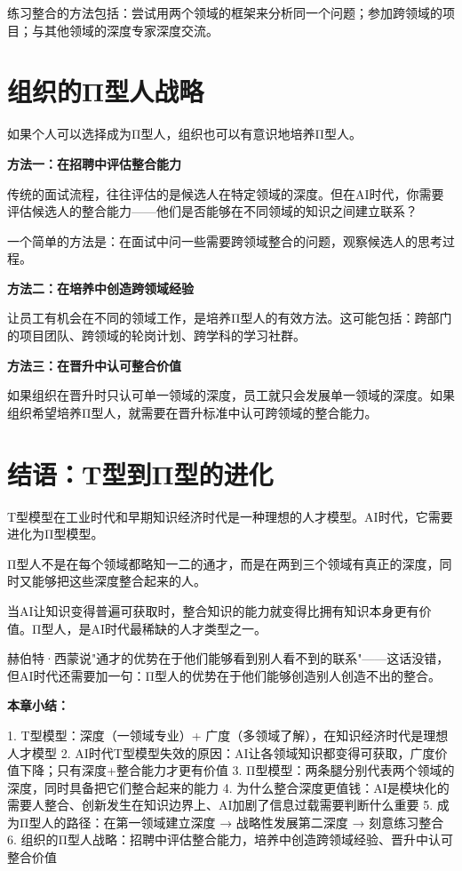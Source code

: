 练习整合的方法包括：尝试用两个领域的框架来分析同一个问题；参加跨领域的项目；与其他领域的深度专家深度交流。

\section{组织的Π型人战略}


如果个人可以选择成为Π型人，组织也可以有意识地培养Π型人。

\textbf{方法一：在招聘中评估整合能力}

传统的面试流程，往往评估的是候选人在特定领域的深度。但在AI时代，你需要评估候选人的整合能力——他们是否能够在不同领域的知识之间建立联系？

一个简单的方法是：在面试中问一些需要跨领域整合的问题，观察候选人的思考过程。

\textbf{方法二：在培养中创造跨领域经验}

让员工有机会在不同的领域工作，是培养Π型人的有效方法。这可能包括：跨部门的项目团队、跨领域的轮岗计划、跨学科的学习社群。

\textbf{方法三：在晋升中认可整合价值}

如果组织在晋升时只认可单一领域的深度，员工就只会发展单一领域的深度。如果组织希望培养Π型人，就需要在晋升标准中认可跨领域的整合能力。

\section{结语：T型到Π型的进化}


T型模型在工业时代和早期知识经济时代是一种理想的人才模型。AI时代，它需要进化为Π型模型。

Π型人不是在每个领域都略知一二的通才，而是在两到三个领域有真正的深度，同时又能够把这些深度整合起来的人。

当AI让知识变得普遍可获取时，整合知识的能力就变得比拥有知识本身更有价值。Π型人，是AI时代最稀缺的人才类型之一。

赫伯特·西蒙说"通才的优势在于他们能够看到别人看不到的联系"——这话没错，但AI时代还需要加一句：Π型人的优势在于他们能够创造别人创造不出的整合。


\textbf{本章小结：}

1. T型模型：深度（一领域专业）+ 广度（多领域了解），在知识经济时代是理想人才模型
2. AI时代T型模型失效的原因：AI让各领域知识都变得可获取，广度价值下降；只有深度+整合能力才更有价值
3. Π型模型：两条腿分别代表两个领域的深度，同时具备把它们整合起来的能力
4. 为什么整合深度更值钱：AI是模块化的需要人整合、创新发生在知识边界上、AI加剧了信息过载需要判断什么重要
5. 成为Π型人的路径：在第一领域建立深度 → 战略性发展第二深度 → 刻意练习整合
6. 组织的Π型人战略：招聘中评估整合能力，培养中创造跨领域经验、晋升中认可整合价值
